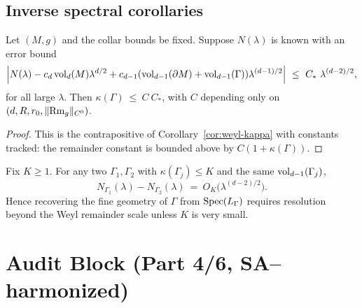\subsection{Inverse spectral corollaries}
\label{subsec:inverse-kappa}

\begin{theorem}
\label{thm:inverse-upper}
Let $(M,g)$ and the collar bounds be fixed. Suppose $N(\lambda)$ is known with an error bound
\[
\Big|N(\lambda)-c_d \operatorname{vol}_d(M)\lambda^{d/2}+c_{d-1}(\operatorname{vol}_{d-1}(\partial M)+\operatorname{vol}_{d-1}(\Gamma))\lambda^{(d-1)/2}\Big|
\ \le\ C_*\ \lambda^{(d-2)/2},
\]
for all large $\lambda$. Then $\kappa(\Gamma)\ \le\ C\ C_*$, with $C$ depending only on $(d,R,r_0,\|{\rm Rm}_g\|_{C^0})$.
\end{theorem}

\begin{proof}
This is the contrapositive of Corollary~\ref{cor:weyl-kappa} with constants tracked: the remainder constant is bounded above by $C(1+\kappa(\Gamma))$.
\end{proof}

\begin{corollary}
\label{cor:indistinguishability}
Fix $K\ge 1$. For any two $\Gamma_1,\Gamma_2$ with $\kappa(\Gamma_j)\le K$ and the same $\operatorname{vol}_{d-1}(\Gamma_j)$,
\[
N_{\Gamma_1}(\lambda)-N_{\Gamma_2}(\lambda)\ =\ O_K\!\big(\lambda^{(d-2)/2}\big).
\]
Hence recovering the fine geometry of $\Gamma$ from $\operatorname{Spec}(L_\Gamma)$ requires resolution beyond the Weyl remainder scale unless $K$ is very small.
\end{corollary}

\section{Audit Block (Part 4/6, SA–harmonized)}
\label{sec:audit-part4}

